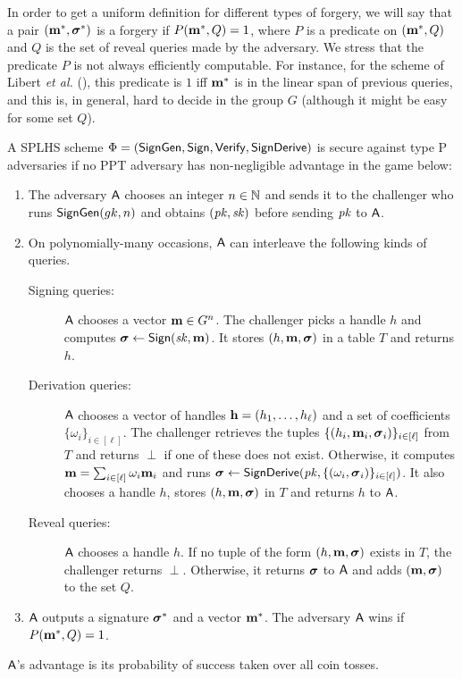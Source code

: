 \label{splhs-unforgeability}

In order to get a uniform definition for different types of forgery, we will say that a pair
$(\mathbf{m}^*,{\boldsymbol \sigma}^*)$ is a forgery if $P(\mathbf{m}^*, Q)=1$, where
$P$ is a predicate on $(\mathbf{m}^*, Q)$ and $Q$ is the set of reveal queries
made by the adversary. We stress that the predicate $P$ is not always efficiently computable. For instance, for the scheme of Libert \textit{et al.} (\cite{C:LPJY13}), this predicate is $1$ iff $\mathbf{m}^*$ is in the linear span of 
previous queries, and this is, in general, hard to decide in the group $G$ (although it might be easy for some set $Q$).  

\begin{definition} A SPLHS scheme $\Phi = (\mathsf{SignGen}, \mathsf{Sign}, \mathsf{Verify}, \mathsf{SignDerive})$ is secure against type P adversaries if no PPT
adversary has non-negligible advantage in the game below:
\begin{enumerate}
\item The adversary $\mathsf{A}$ chooses an integer $n \in \mathbb{N}$ and sends it to the challenger who runs
$\mathsf{SignGen}(gk, n)$
and obtains $(\mathit{pk},\mathit{sk})$ before sending $\mathit{pk}$ to $\mathsf{A}$.
\item On polynomially-many occasions, $\mathsf{A}$ can interleave the following kinds of queries.
\begin{description}

\item[Signing queries:] $\mathsf{A}$ chooses a vector $\mathbf{m}\in G^n$.
The challenger picks a handle
$h$ and computes ${\boldsymbol \sigma}\gets\mathsf{Sign}(\mathit{sk}, \mathbf{m})$. It stores $(h,\mathbf{m}, {\boldsymbol \sigma})$
in a table $T$ and returns $h$.

\item[Derivation queries:] $\mathsf{A}$ chooses a vector of handles $\mathbf{h} = (h_1, \ldots , h_\ell)$ and a set of coefficients
$\{\omega_i\}_{i\in[\ell]}$. The challenger retrieves the tuples $\{(h_i,\mathbf{m}_i, {\boldsymbol \sigma}_i)\}_{i\in[\ell]}$
from $T$ and returns $\perp$ if one
of these does not exist. Otherwise, it computes
$\mathbf{m} = \sum_{i\in[\ell]} \omega_i\mathbf{m}_i$ and runs
${\boldsymbol \sigma}\gets\mathsf{SignDerive}(\mathit{pk},\{(\omega_i,{\boldsymbol \sigma}_i)\}_{i\in[\ell]})$.
It also chooses a handle $h$, stores $(h,\mathbf{m}, {\boldsymbol \sigma})$ in $T$ and returns $h$
to $\mathsf{A}$.

\item[Reveal queries:] $\mathsf{A}$ chooses a handle $h$. If no tuple of the form $(h,\mathbf{m},{\boldsymbol \sigma})$
exists in $T$, the challenger returns $\perp$. Otherwise, it returns ${\boldsymbol \sigma}$
to $\mathsf{A}$ and adds $(\mathbf{m}, {\boldsymbol \sigma})$ to the set $Q$.
\end{description}

\item $\mathsf{A}$ outputs a signature ${\boldsymbol \sigma}^*$ and a vector $\mathbf{m}^*$.
The adversary $\mathsf{A}$ wins if $P(\mathbf{m}^*,Q)=1$.
\end{enumerate}
$\mathsf{A}$’s advantage is its probability of success taken over all coin tosses.
\end{definition}

